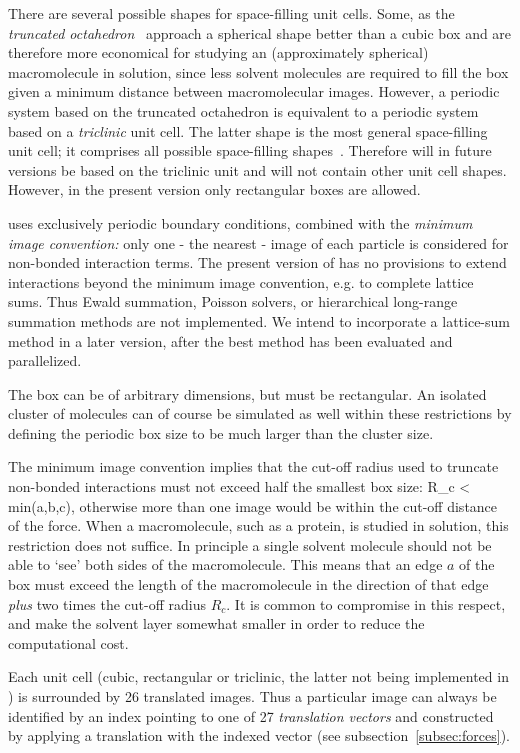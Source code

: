 There are several possible shapes for space-filling unit cells. Some,
as the {\em truncated octahedron}~\cite{Adams79} approach a spherical
shape better than a cubic box and are therefore more economical for
studying an (approximately spherical) macromolecule in solution, since
less solvent molecules are required to fill the box given a minimum
distance between macromolecular images. However, a periodic system
based on the truncated octahedron is equivalent to a periodic system
based on a {\em triclinic} unit cell. The latter shape is the most
general space-filling unit cell; it comprises all possible
space-filling shapes~\cite{Bekker95}. Therefore {\gromacs} will in
future versions be based on the triclinic unit and will not contain
other unit cell shapes. However, in the present version
only rectangular boxes are allowed.
  

\gromacs uses exclusively periodic boundary conditions, combined
with the {\em minimum image convention:} only one - the nearest -
image of each particle is considered for non-bonded interaction terms.
The present version of \gromacs has no provisions to extend
interactions beyond the minimum image convention, e.g. to complete
lattice sums. Thus Ewald summation, Poisson solvers, or hierarchical
long-range summation methods are not implemented. We intend to
incorporate a lattice-sum method in a later version, after the best
method has been evaluated and parallelized.
  
The box can be of arbitrary dimensions, but must be rectangular. An
isolated cluster of molecules can of course be simulated as well within these
restrictions by defining the periodic box size to be much larger than
the cluster size.

The minimum image convention implies that the cut-off radius used to
truncate non-bonded interactions must not exceed half the smallest box
size:
\beq
  R_c < \half min(a,b,c),
\eeq
otherwise more than one image would be within the cut-off distance of
the force. When a macromolecule, such as a protein, is studied in
solution,  this restriction does not suffice. In principle a single
solvent  molecule should not be able
to `see' both sides of the macromolecule. This means that an edge $a$
of the box must exceed the length of the macromolecule in the
direction of that edge {\em plus} two times the cut-off radius $R_c$.
It is common to compromise in this respect, and make the solvent layer
somewhat smaller in order to reduce the computational cost.

Each unit cell (cubic, rectangular or triclinic, the latter not being
implemented in \gromacs) is surrounded by 26
translated images. Thus a particular image can always be identified by an index
pointing to one of 27 {\em translation vectors} and constructed by
applying a translation with the indexed vector (see
subsection~\ref{subsec:forces}). 

